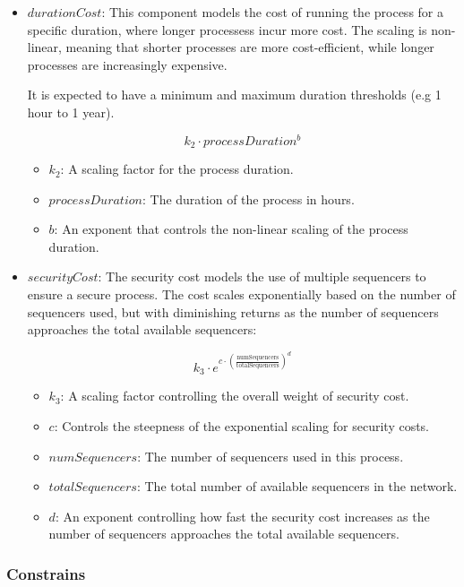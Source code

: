 \begin{itemize}
	\item $durationCost$: This component models the cost of running the process for a specific duration, where longer processess incur more cost. The scaling is non-linear, meaning that shorter processes are more cost-efficient, while longer processes are increasingly expensive.
	
		It is expected to have a minimum and maximum duration thresholds (e.g 1 hour to 1 year).
	
		$$ k_2 \cdot processDuration^b $$
		
		\begin{itemize}
			\item $k_2$: A scaling factor for the process duration.
			\item $processDuration$: The duration of the process in hours.
			\item $b$: An exponent that controls the non-linear scaling of the process duration.
		\end{itemize}
	
	\item $securityCost$: The security cost models the use of multiple sequencers to ensure a secure process. The cost scales exponentially based on the number of sequencers used, but with diminishing returns as the number of sequencers approaches the total available sequencers:
	
		$$ k_3 \cdot e^{c \cdot \left( \frac{\text{numSequencers}}{\text{totalSequencers}} \right)^d} $$
		
		\begin{itemize}
			\item $k_3$: A scaling factor controlling the overall weight of security cost.
			\item $c$: Controls the steepness of the exponential scaling for security costs.
			\item $numSequencers$: The number of sequencers used in this process.
			\item $totalSequencers$: The total number of available sequencers in the network.
			\item $d$: An exponent controlling how fast the security cost increases as the number of sequencers approaches the total available sequencers.
		\end{itemize}
\end{itemize}

\subsubsection{Constrains}

